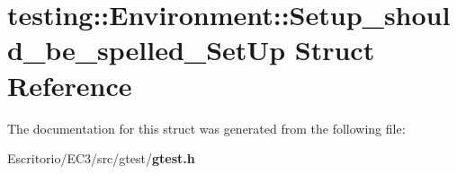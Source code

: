 \section{testing::Environment::Setup\_\-should\_\-be\_\-spelled\_\-SetUp Struct Reference}
\label{structtesting_1_1Environment_1_1Setup__should__be__spelled__SetUp}


The documentation for this struct was generated from the following file:\begin{CompactItemize}
\item 
Escritorio/EC3/src/gtest/{\bf gtest.h}\end{CompactItemize}
